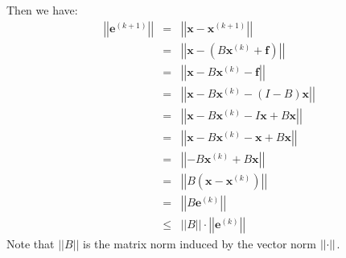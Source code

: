 \begin{itemize}
\begin{itemize}
        Then we have:
        \begin{equation*}
            \begin{array}{rcl}
                \left|\left|\mathbf{e}^{\left(k+1\right)}\right|\right| &=& \left|\left|\mathbf{x}-\mathbf{x}^{\left(k+1\right)}\right|\right| \\ [.5em]
                &=& \left|\left|\mathbf{x}-\left(B\mathbf{x}^{\left(k\right)} + \mathbf{f}\right)\right|\right| \\ [.5em]
                &=& \left|\left|\mathbf{x}-B\mathbf{x}^{\left(k\right)} - \mathbf{f}\right|\right| \\ [.5em]
                &=& \left|\left|\mathbf{x}-B\mathbf{x}^{\left(k\right)} - \left(I-B\right)\mathbf{x}\right|\right| \\ [.5em]
                &=& \left|\left|\mathbf{x}-B\mathbf{x}^{\left(k\right)} - I\mathbf{x} + B\mathbf{x}\right|\right| \\ [.5em]
                &=& \left|\left|\mathbf{x}-B\mathbf{x}^{\left(k\right)} - \mathbf{x} + B\mathbf{x}\right|\right| \\ [.5em]
                &=& \left|\left|-B\mathbf{x}^{\left(k\right)} + B\mathbf{x}\right|\right| \\ [.5em]
                &=& \left|\left|B\left(\mathbf{x} - \mathbf{x}^{\left(k\right)}\right)\right|\right| \\ [.5em]
                &=& \left|\left|B\mathbf{e}^{\left(k\right)}\right|\right| \\ [.5em]
                &\le& \left|\left|B\right|\right| \cdot \left|\left|\mathbf{e}^{\left(k\right)}\right|\right|
            \end{array}
        \end{equation*}
        Note that $\left|\left|B\right|\right|$ is the matrix norm induced by the vector norm $\left|\left|\cdot\right|\right|$.


\end{itemize}
\end{itemize}
